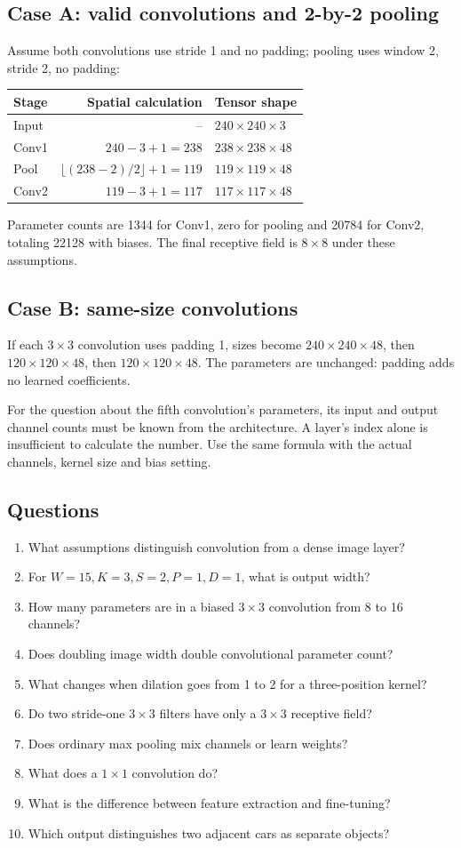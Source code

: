 \documentclass[11pt]{article}
\begin{document}
\subsection{Case A: valid convolutions and 2-by-2 pooling}
Assume both convolutions use stride 1 and no padding; pooling uses window 2, stride 2, no padding:
\begin{center}
\begin{tabular}{lrl}
\toprule Stage & Spatial calculation & Tensor shape\\\midrule
Input & -- & $240\times240\times3$\\
Conv1 & $240-3+1=238$ & $238\times238\times48$\\
Pool & $\lfloor(238-2)/2\rfloor+1=119$ & $119\times119\times48$\\
Conv2 & $119-3+1=117$ & $117\times117\times48$\\\bottomrule
\end{tabular}
\end{center}
Parameter counts are 1344 for Conv1, zero for pooling and 20784 for Conv2, totaling 22128 with biases. The final receptive field is $8\times8$ under these assumptions.
\subsection{Case B: same-size convolutions}
If each $3\times3$ convolution uses padding 1, sizes become $240\times240\times48$, then $120\times120\times48$, then $120\times120\times48$. The parameters are unchanged: padding adds no learned coefficients.

For the question about the fifth convolution's parameters, its input and output channel counts must be known from the architecture. A layer's index alone is insufficient to calculate the number. Use the same formula with the actual channels, kernel size and bias setting.
\subsection{Questions}
\begin{enumerate}
\item What assumptions distinguish convolution from a dense image layer?
\item For $W=15,K=3,S=2,P=1,D=1$, what is output width?
\item How many parameters are in a biased $3\times3$ convolution from 8 to 16 channels?
\item Does doubling image width double convolutional parameter count?
\item What changes when dilation goes from 1 to 2 for a three-position kernel?
\item Do two stride-one $3\times3$ filters have only a $3\times3$ receptive field?
\item Does ordinary max pooling mix channels or learn weights?
\item What does a $1\times1$ convolution do?
\item What is the difference between feature extraction and fine-tuning?
\item Which output distinguishes two adjacent cars as separate objects?
\end{enumerate}
\end{document}

